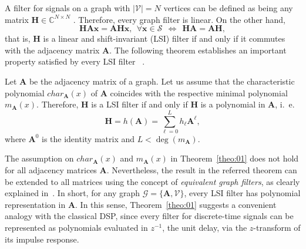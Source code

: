 A filter for signals on a graph with $ |\mathcal{V}| = N $ vertices can be defined as being any matrix $ \mathbf{H} \in \mathbb{C}^{N \times N} $ \cite{sandryhaila2013discrete}. Therefore, every graph filter is linear. On the other hand,
\begin{equation}\label{eq:shift_invariance}
\mathbf{HA}\mathbf{x} = \mathbf{AH}\mathbf{x},\:\:\forall \mathbf{x} \in \mathcal{S} \:\:\Leftrightarrow\:\:\mathbf{HA} = \mathbf{AH},
\end{equation}
\noindent that is, $ \mathbf{H} $ is a linear and shift-invariant (LSI) filter if and only if it commutes with the adjacency matrix $ \mathbf{A} $. The following theorem establishes an important property satisfied by every LSI filter~\cite{sandryhaila2013discrete} .
\vspace{0.2cm}
\begin{theorem}
	\label{theo:01}
	Let $ \mathbf{A} $ be the adjacency matrix of a graph. Let us assume that the characteristic polynomial $char_{\mathbf{A}}(x)$ of $\mathbf{A}$ coincides with the respective minimal polynomial $m_{\mathbf{A}}(x) $. Therefore, $ \mathbf{H} $ is a LSI filter if and only if $ \mathbf{H} $ is a polynomial in $ \mathbf{A} $, i.~e.
	\begin{equation}\label{eq:filtro}
	\mathbf{H} = h(\mathbf{A}) = \sum_{\ell=0}^{L} h_\ell \mathbf{A}^\ell,
	\end{equation}
where $ \mathbf{A}^0 $ is the identity matrix and $ L < \deg(m_{\mathbf{A}}) $.
\end{theorem}

The assumption on $char_{\mathbf{A}}(x)$ and $m_{\mathbf{A}}(x)$ in Theorem~\ref{theo:01} does not hold for all adjacency matrices $\mathbf{A}$. Nevertheless, the result in the referred theorem can be extended to all matrices using the concept of \emph{equivalent graph filters}, as clearly explained in~\cite{sandryhaila2013filters}. In short, for any graph $\mathcal{G} = \{\mathbf{A}, \mathcal{V}\}$, every LSI filter has polynomial representation in $\mathbf{A}$. In this sense, Theorem~\ref{theo:01} suggests a convenient analogy with the classical DSP, since every filter for discrete-time signals can be represented as polynomials evaluated in $ z^{-1} $, the unit delay, via the $z$-transform of its impulse response.

